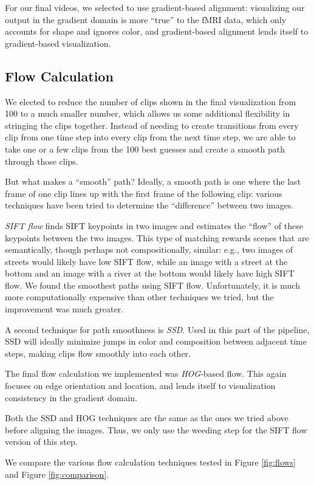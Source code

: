 For our final videos, we selected to use gradient-based alignment: visualizing our output in the gradient domain is more ``true'' to the fMRI data, which only accounts for shape and ignores color, and gradient-based alignment lends itself to gradient-based visualization.

\subsection{Flow Calculation}
We elected to reduce the number of clips shown in the final visualization from 100 to a much smaller number, which allows us some additional flexibility in stringing the clips together.  Instead of needing to create transitions from every clip from one time step into every clip from the next time step, we are able to take one or a few clips from the 100 best guesses and create a smooth path through those clips.

But what makes a ``smooth'' path?  Ideally, a smooth path is one where the last frame of one clip lines up with the first frame of the following clip: various techniques have been tried to determine the ``difference'' between two images.

\emph{SIFT flow} \cite{SIFTflow} finds SIFT keypoints in two images and estimates the ``flow'' of these keypoints between the two images. This type of matching rewards scenes that are semantically, though perhaps not compositionally, similar: e.g., two images of streets would likely have low SIFT flow, while an image with a street at the bottom and an image with a river at the bottom would likely have high SIFT flow.  We found the smoothest paths using SIFT flow. Unfortunately, it is much more computationally expensive than other techniques we tried, but the improvement was much greater.

A second technique for path smoothness is \emph{SSD}.  Used in this part of the pipeline, SSD will ideally minimize jumps in color and composition between adjacent time steps, making clips flow smoothly into each other.

The final flow calculation we implemented was \emph{HOG}-based flow.  This again focuses on edge orientation and location, and lends itself to visualization consistency in the gradient domain.

Both the SSD and HOG techniques are the same as the ones we tried above before aligning the images. Thus, we only use the weeding step for the SIFT flow version of this step.

We compare the various flow calculation techniques tested in Figure \ref{fig:flows} and Figure \ref{fig:comparison}.

